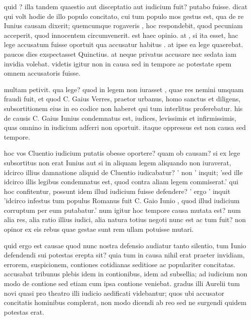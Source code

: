  quid ? illa tandem quaestio aut disceptatio aut iudicium fuit? putabo fuisse. dicat qui volt hodie de illo populo concitato, cui tum populo mos gestus est, qua de re Iunius causam dixerit; quemcumque rogaveris , hoc respondebit, quod pecuniam acceperit, quod innocentem circumvenerit. est haec opinio. at , si ita esset, hac lege accusatum fuisse oportuit qua accusatur habitus . at ipse ea lege quaerebat. paucos dies exspectasset Quinctius. at neque privatus accusare nec sedata iam invidia volebat. videtis igitur non in causa sed in tempore ac potestate spem omnem accusatoris fuisse.

 multam petivit. qua lege? quod in legem non iurasset , quae res nemini umquam fraudi fuit, et quod C. Gaius Verres, praetor urbanus, homo sanctus et diligens, subsortitionem eius in eo codice non haberet qui tum interlitus proferebatur. his de causis C. Gaius Iunius condemnatus est, iudices, levissimis et infirmissimis, quas omnino in iudicium adferri non oportuit. itaque oppressus est non causa sed tempore.

 hoc vos Cluentio iudicium putatis obesse oportere? quam ob causam? si ex lege subsortitus non erat Iunius aut si in aliquam legem aliquando non iuraverat, idcirco illius damnatione aliquid de Cluentio iudicabatur? ' non ' inquit; 'sed ille idcirco illis legibus condemnatus est, quod contra aliam legem commiserat.' qui hoc confitentur, possunt idem illud iudicium fuisse defendere? ' ergo ' inquit 'idcirco infestus tum populus Romanus fuit C. Gaio Iunio , quod illud iudicium corruptum per eum putabatur.' num igitur hoc tempore causa mutata est? num alia res, alia ratio illius iudici, alia natura totius negoti nunc est ac tum fuit? non opinor ex eis rebus quae gestae sunt rem ullam potuisse mutari.

 quid ergo est causae quod nunc nostra defensio audiatur tanto silentio, tum Iunio defendendi sui potestas erepta sit? quia tum in causa nihil erat praeter invidiam, errorem, suspicionem, contiones cotidianas seditiose ac populariter concitatas. accusabat tribunus plebis idem in contionibus, idem ad subsellia; ad iudicium non modo de contione sed etiam cum ipsa contione veniebat. gradus illi Aurelii tum novi quasi pro theatro illi iudicio aedificati videbantur; quos ubi accusator concitatis hominibus complerat, non modo dicendi ab reo sed ne surgendi quidem potestas erat.

